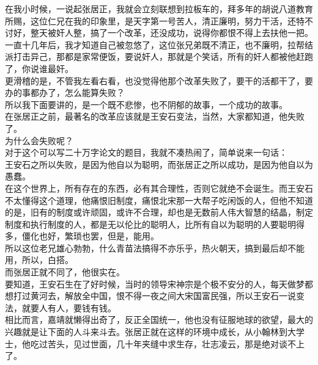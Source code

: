 \begin{multicols}{\theparacolNo}
在我小时候，一说起张居正，我就会立刻联想到拉板车的，拜多年的胡说八道教育所赐，这位仁兄在我的印象里，是天字第一号苦人，清正廉明，努力干活，还特不讨好，整天被奸人整，搞了一个改革，还没成功，说得你都恨不得上去扶他一把。\\

一直十几年后，我才知道自己被忽悠了，这位张兄弟既不清正，也不廉明，拉帮结派打击异己，那都是家常便饭，要说奸人，那就是个笑话，所有的奸人都被他赶跑了，你说谁最奸。\\

更滑稽的是，不管我左看右看，也没觉得他那个改革失败了，要干的活都干了，要办的事都办了，怎么能算失败？\\

所以我下面要讲的，是一个既不悲惨，也不阴郁的故事，一个成功的故事。\\

在张居正之前，最著名的改革应该就是王安石变法，当然，大家都知道，他失败了。\\

为什么会失败呢？\\

对于这个可以写二十万字论文的题目，我就不凑热闹了，简单说来一句话：\\

王安石之所以失败，是因为他自以为聪明，而张居正之所以成功，是因为他自以为愚蠢。\\

在这个世界上，所有存在的东西，必有其合理性，否则它就绝不会诞生。而王安石不太懂得这个道理，他痛恨旧制度，痛恨北宋那一大帮子吃闲饭的人，但他不知道的是，旧有的制度或许顽固，或许不合理，却也是无数前人伟大智慧的结晶，制定制度和执行制度的人，都是无以伦比的聪明人，比所有自以为聪明的人要聪明得多，僵化也好，繁琐也罢，但是，能用。\\

所以这位老兄雄心勃勃，什么青苗法搞得不亦乐乎，热火朝天，搞到最后却不能用，所以，白搭。\\

而张居正就不同了，他很实在。\\

要知道，王安石生在了好时候，当时的领导宋神宗是个极不安分的人，每天做梦都想打过黄河去，解放全中国，恨不得一夜之间大宋国富民强，所以王安石一说变法，就要人有人，要钱有钱。\\

相比而言，嘉靖就懒得出奇了，反正全国统一，他也没有征服地球的欲望，最大的兴趣就是让下面的人斗来斗去。张居正就在这样的环境中成长，从小翰林到大学士，他吃过苦头，见过世面，几十年夹缝中求生存，壮志凌云，那是绝对谈不上了。\\


\end{multicols}
